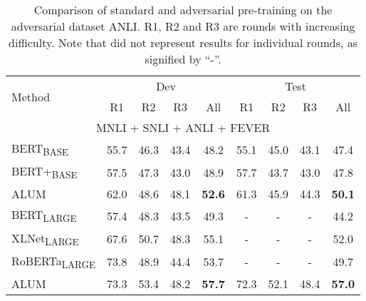 \documentclass[11pt,a4paper]{article}
\newcommand{\alumbert}{ALUM}
\newcommand{\alumrobertalarge}{ALUM}
\begin{document}
\begin{table*}[htb!]
    \centering
    \begin{tabular}{l|c|c|c|c|c|c|c|c}
    \hline
\toprule    
         \multirow{2}{*}{Method} & \multicolumn{4}{c|}{Dev} & \multicolumn{4}{c}{Test}  \\
         \cline{2-9}
          &  R1 & R2 & R3 & All & R1 & R2 & R3 & All  \\
          \hline 
 		\multicolumn{9}{c}{ MNLI + SNLI + ANLI + FEVER  }  \\ \hline
 BERT\textsubscript{BASE}&55.7&46.3&43.4 &48.2 &55.1 &45.0 &43.1 & 47.4\\ \hline
 BERT+\textsubscript{BASE}&57.5 &47.3 & 43.0& 48.9&57.7 &43.7 & 43.0&47.8\\ \hline
\alumbert{} &62.0&48.6&48.1 & \textbf{52.6} &61.3 &45.9 &44.3 & \textbf{50.1}\\ \hline \hline			
          BERT\textsubscript{LARGE}  \citep{nie2019adversarial} &57.4&48.3&43.5& 49.3 &-&-&-& 44.2 \\
		\hline
		XLNet\textsubscript{LARGE} \citep{nie2019adversarial}&67.6&50.7&48.3& 55.1 &-&-&-& 52.0 \\
		\hline
		RoBERTa\textsubscript{LARGE} \citep{nie2019adversarial} &73.8&48.9&44.4& 53.7 &-&-&-& 49.7 \\
		\hline 
	    \alumrobertalarge{} & 73.3&53.4&48.2& \textbf{57.7} &72.3&52.1&48.4& \textbf{57.0} \\
\bottomrule
    \end{tabular}
    \caption{Comparison of standard and adversarial pre-training on the adversarial dataset ANLI. R1, R2 and R3 are rounds with increasing difficulty. Note that \citet{nie2019adversarial} did not represent results for individual rounds, as signified by ``-''.}
    \label{tab:anli_full}
\end{table*}
\end{document}
